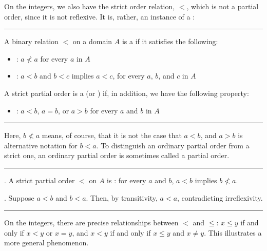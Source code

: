 \documentclass[letterpaper,10pt,english]{sphinxmanual}
\begin{document}
\sphinxAtStartPar
On the integers, we also have the strict order relation, \(<\), which is not a partial order, since it is not reflexive. It is, rather, an instance of a :


\bigskip\hrule\bigskip


\sphinxAtStartPar
{} A binary relation \(<\) on a domain \(A\) is a  if it satisfies the following:
\begin{itemize}
\item {} 
\sphinxAtStartPar
{}: \(a \nless a\) for every \(a\) in \(A\)

\item {} 
\sphinxAtStartPar
{}: \(a < b\) and \(b < c\) implies \(a < c\), for every \(a\), \(b\), and \(c\) in \(A\)

\end{itemize}

\sphinxAtStartPar
A strict partial order is a  (or ) if, in addition, we have the following property:
\begin{itemize}
\item {} 
\sphinxAtStartPar
{}: \(a < b\), \(a = b\), or \(a > b\) for every \(a\) and \(b\) in \(A\)

\end{itemize}


\bigskip\hrule\bigskip


\sphinxAtStartPar
Here, \(b \nless a\) means, of course, that it is not the case that \(a < b\), and \(a > b\) is alternative notation for \(b < a\). To distinguish an ordinary partial order from a strict one, an ordinary partial order is sometimes called a  partial order.


\bigskip\hrule\bigskip


\sphinxAtStartPar
{}. A strict partial order \(<\) on \(A\) is : for every \(a\) and \(b\), \(a < b\) implies \(b \nless a\).

\sphinxAtStartPar
{}. Suppose \(a < b\) and \(b < a\). Then, by transitivity, \(a < a\), contradicting irreflexivity.


\bigskip\hrule\bigskip


\sphinxAtStartPar
On the integers, there are precise relationships between \(<\) and \(\leq\): \(x \leq y\) if and only if \(x < y\) or \(x = y\), and \(x < y\) if and only if \(x \leq y\) and \(x \neq y\). This illustrates a more general phenomenon.
\end{document}
